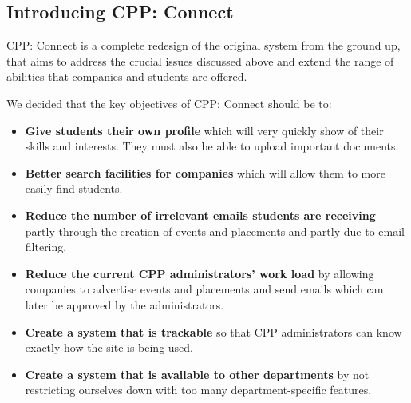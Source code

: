 \subsection{Introducing CPP: Connect}
CPP: Connect is a complete redesign of the original system from the ground up, that aims to address the crucial issues discussed above and extend the range of abilities that companies and students are offered.

We decided that the key objectives of CPP: Connect should be to:
\begin{itemize}
  \item \textbf{Give students their own profile} which will very quickly show of their skills and interests. They must also be able to upload important documents.
  \item \textbf{Better search facilities for companies} which will allow them to more easily find students.
  \item \textbf{Reduce the number of irrelevant emails students are receiving} partly through the creation of events and placements and partly due to email filtering.
  \item \textbf{Reduce the current CPP administrators' work load} by allowing companies to advertise events and placements and send emails which can later be approved by the administrators.
  \item \textbf{Create a system that is trackable} so that CPP administrators can know exactly how the site is being used.
  \item \textbf{Create a system that is available to other departments} by not restricting ourselves down with too many department-specific features.
\end{itemize}